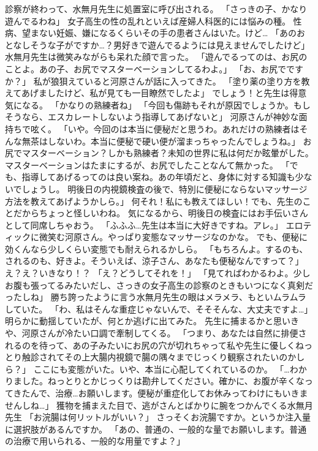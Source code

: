 診察が終わって、水無月先生に処置室に呼び出される。
「さっきの子、かなり遊んでるわね」
女子高生の性の乱れといえば産婦人科医的には悩みの種。
性病、望まない妊娠、嫌になるくらいその手の患者さんはいた。けど…
「あのおとなしそうな子がですか…？男好きで遊んでるようには見えませんでしたけど」
水無月先生は微笑みながらも呆れた顔で言った。
「遊んでるってのは、お尻のことよ。あの子、お尻でマスターベーションしてるわよ。」
「お、お尻でですか？」
私が狼狽えていると河原さんが話に入ってきた。
「塗り薬の塗り方を教えてあげましたけど、私が見ても一目瞭然でしたよ」
でしょう！と先生は得意気になる。
「かなりの熟練者ね」
「今回も傷跡もそれが原因でしょうか。もしそうなら、エスカレートしないよう指導してあげないと」
河原さんが神妙な面持ちで呟く。
「いや。今回のは本当に便秘だと思うわ。あれだけの熟練者はそんな無茶はしないわ。本当に便秘で硬い便が溜まっちゃったんでしょうね。」
お尻でマスターベーション？しかも熟練者？未知の世界に私は何だか眩暈がした。
マスターベーションはたまにするが、お尻でしたことなんて無かった。
「でも、指導してあげるってのは良い案ね。あの年頃だと、身体に対する知識も少ないでしょうし。
明後日の内視鏡検査の後で、特別に便秘にならないマッサージ方法を教えてあげようかしら。」
何それ！私にも教えてほしい！でも、先生のことだからちょっと怪しいわね。
気になるから、明後日の検査にはお手伝いさんとして同席しちゃおう。
「ふふふ…先生は本当に大好きですね。アレ。」
エロティックに微笑む河原さん。やっぱり変態なマッサージなのかな。
でも、便秘に効くんなら少しくらい変態でも耐えられるかしら。
「もちろんよ。するのも、されるのも、好きよ。そういえば、涼子さん、あなたも便秘なんですって？」
え？え？いきなり！？
「え？どうしてそれを！」
「見てればわかるわよ。少しお腹も張ってるみたいだし、さっきの女子高生の診察のときもいつになく真剣だったしね」
勝ち誇ったように言う水無月先生の眼はメラメラ、もといムラムラしていた。
「わ、私はそんな重症じゃないんで、そそそんな、大丈夫ですよ…」
明らかに動揺していたが、何とか逃げに出てみた。
先生に捕まるかと思いきや、河原さんが冷たい口調で牽制してくる。
「つまり、あなたは自然に排便されるのを待って、あの子みたいにお尻の穴が切れちゃって私や先生に優しくねっとり触診されてその上大腸内視鏡で腸の隅々までじっくり観察されたいのかしら？」
ここにも変態がいた。いや、本当に心配してくれているのか。
「…わかりました。ねっとりとかじっくりは勘弁してください。確かに、お腹が辛くなってきたんで、治療…お願いします。便秘が重症化してお休みってわけにもいきませんしね…」
獲物を捕まえた目で、逃がさんとばかりに腕をつかんでくる水無月先生
「お浣腸は何リットルがいい？」
さっそくお浣腸ですか。というか注入量に選択肢があるんですか。
「あの、普通の、一般的な量でお願いします。普通の治療で用いられる、一般的な用量ですよ？」
